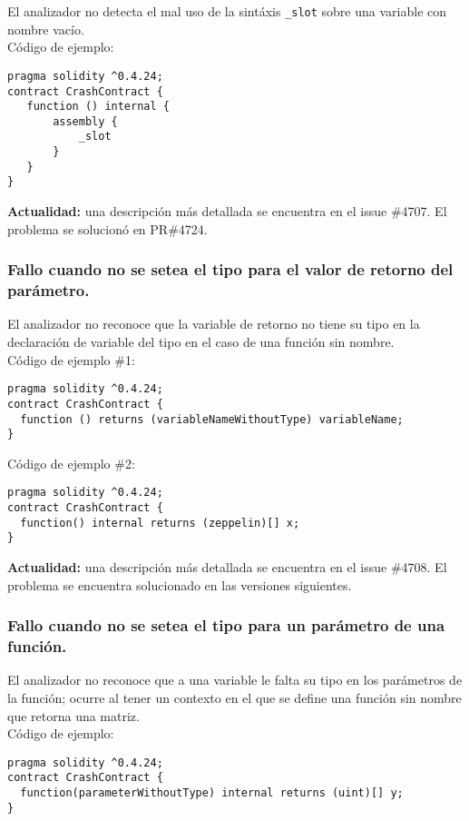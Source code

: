 El analizador no detecta el mal uso de la sintáxis \verb|_slot| sobre una variable con nombre vacío.\\

Código de ejemplo:
\begin{lstlisting}[language=Solidity]
pragma solidity ^0.4.24;
contract CrashContract {
   function () internal {
       assembly {
           _slot
       }
   }
}
\end{lstlisting}

\textbf{Actualidad:} una descripción más detallada se encuentra en el issue \#4707. El problema se solucionó en PR\#4724.

\subsubsection{Fallo cuando no se setea el tipo para el valor de retorno del parámetro.}

El analizador no reconoce que la variable de retorno no tiene su tipo en la declaración de variable del tipo en el caso de una función sin nombre.\\

Código de ejemplo \#1:
\begin{lstlisting}[language=Solidity]
pragma solidity ^0.4.24;
contract CrashContract {
  function () returns (variableNameWithoutType) variableName;
}
\end{lstlisting}

Código de ejemplo \#2:
\begin{lstlisting}[language=Solidity]
pragma solidity ^0.4.24;
contract CrashContract {
  function() internal returns (zeppelin)[] x;
}
\end{lstlisting}

\textbf{Actualidad:} una descripción más detallada se encuentra en el issue \#4708. El problema se encuentra solucionado en las versiones siguientes. 

\subsubsection{Fallo cuando no se setea el tipo para un parámetro de una función.}

El analizador no reconoce que a una variable le falta su tipo en los parámetros de la función; ocurre al tener un contexto en el que se define una función sin nombre que retorna una matriz.\\

Código de ejemplo:
\begin{lstlisting}[language=Solidity]
pragma solidity ^0.4.24;
contract CrashContract {
  function(parameterWithoutType) internal returns (uint)[] y;
}
\end{lstlisting}

